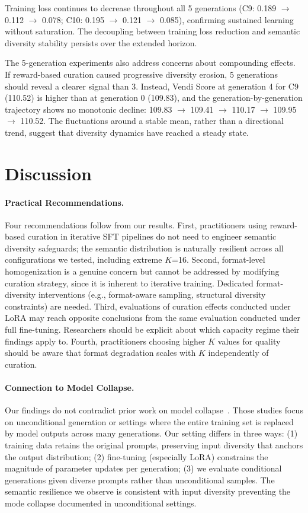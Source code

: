 \documentclass[11pt,a4paper]{article}
\begin{document}
Training loss continues to decrease throughout all 5 generations (C9: 0.189 $\to$ 0.112 $\to$ 0.078; C10: 0.195 $\to$ 0.121 $\to$ 0.085), confirming sustained learning without saturation. The decoupling between training loss reduction and semantic diversity stability persists over the extended horizon.

The 5-generation experiments also address concerns about compounding effects. If reward-based curation caused progressive diversity erosion, 5 generations should reveal a clearer signal than 3. Instead, Vendi Score at generation 4 for C9 (110.52) is higher than at generation 0 (109.83), and the generation-by-generation trajectory shows no monotonic decline: 109.83 $\to$ 109.41 $\to$ 110.17 $\to$ 109.95 $\to$ 110.52. The fluctuations around a stable mean, rather than a directional trend, suggest that diversity dynamics have reached a steady state.

\section{Discussion}

\paragraph{Practical Recommendations.}
Four recommendations follow from our results. First, practitioners using reward-based curation in iterative SFT pipelines do not need to engineer semantic diversity safeguards; the semantic distribution is naturally resilient across all configurations we tested, including extreme $K$=16. Second, format-level homogenization is a genuine concern but cannot be addressed by modifying curation strategy, since it is inherent to iterative training. Dedicated format-diversity interventions (e.g., format-aware sampling, structural diversity constraints) are needed. Third, evaluations of curation effects conducted under LoRA may reach opposite conclusions from the same evaluation conducted under full fine-tuning. Researchers should be explicit about which capacity regime their findings apply to. Fourth, practitioners choosing higher $K$ values for quality should be aware that format degradation scales with $K$ independently of curation.

\paragraph{Connection to Model Collapse.}
Our findings do not contradict prior work on model collapse~\cite{shumailov2024curse,alemohammad2024self}. Those studies focus on unconditional generation or settings where the entire training set is replaced by model outputs across many generations. Our setting differs in three ways: (1) training data retains the original prompts, preserving input diversity that anchors the output distribution; (2) fine-tuning (especially LoRA) constrains the magnitude of parameter updates per generation; (3) we evaluate conditional generations given diverse prompts rather than unconditional samples. The semantic resilience we observe is consistent with input diversity preventing the mode collapse documented in unconditional settings.
\end{document}
